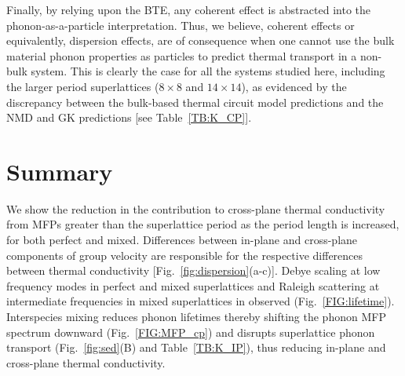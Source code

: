 \documentclass[aps,prb,preprint,preprintnumbers,amsmath,amssymb,floatfix,superscriptaddress]{revtex4}
\begin{document}
Finally, by relying upon the BTE, any coherent effect is abstracted into the phonon-as-a-particle interpretation. Thus, we believe, coherent effects or equivalently, dispersion effects, are of consequence when one cannot use the bulk material phonon properties as particles to predict thermal transport in a non-bulk system. This is clearly the case for all the systems studied here, including the larger period superlattices ($8 \times 8$ and $14 \times 14$), as evidenced by the discrepancy between the bulk-based thermal circuit model predictions and the NMD and GK predictions [see Table~\ref{TB:K_CP}].

\section{Summary}

We show the reduction in the contribution to cross-plane thermal conductivity from MFPs greater than the superlattice period as the period length is increased, for both perfect and mixed. Differences between in-plane and cross-plane components of group velocity are responsible for the respective differences between thermal conductivity [Fig.~\ref{fig:dispersion}(a-c)]. Debye scaling at low frequency modes in perfect and mixed superlattices and Raleigh scattering at intermediate frequencies in mixed superlattices in observed (Fig.~\ref{FIG:lifetime}). Interspecies mixing reduces phonon lifetimes thereby shifting the phonon MFP spectrum downward (Fig.~\ref{FIG:MFP_cp}) and disrupts superlattice phonon transport (Fig.~\ref{fig:sed}(B) and Table~\ref{TB:K_IP}), thus reducing in-plane and cross-plane thermal conductivity.

\newpage


\end{document}
